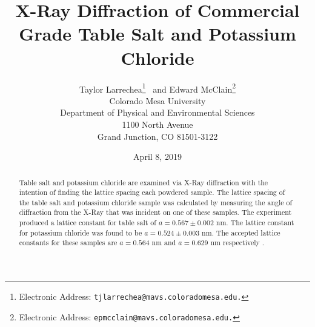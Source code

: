 \documentclass[twocolumn]{article}
\title{\textbf{X-Ray Diffraction of Commercial Grade Table Salt and Potassium Chloride}}
\author{Taylor Larrechea\footnote{Electronic Address: \texttt{tjlarrechea@mavs.coloradomesa.edu.}} \ and Edward McClain\footnote{Electronic Address: \texttt{epmcclain@mavs.coloradomesa.edu.}} \\
    Colorado Mesa University \\
    Department of Physical and Environmental Sciences \\
    1100 North Avenue \\
    Grand Junction, CO 81501-3122}
\date{April 8, 2019}
\begin{document}
\maketitle
\begin{abstract}
Table salt and potassium chloride are examined via X-Ray diffraction with the intention of finding the lattice spacing each powdered sample. The lattice spacing of the table salt and potassium chloride sample was calculated by measuring the angle of diffraction from the X-Ray that was incident on one of these samples. The experiment produced a lattice constant for table salt of $a=0.567\pm0.002$ nm. The lattice constant for potassium chloride was found to be $a=0.524\pm0.003$ nm. The accepted lattice constants for these samples are $a=0.564$ nm and $a=0.629$ nm respectively \cite{WikiLattice}.
\end{abstract}
\end{document}
